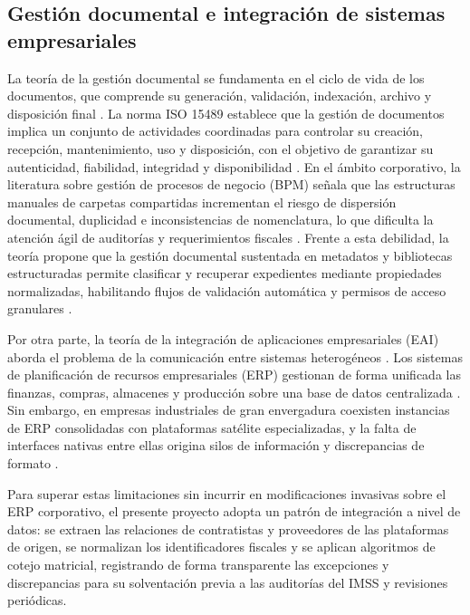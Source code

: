 \subsection{Gestión documental e integración de sistemas empresariales}

La teoría de la gestión documental se fundamenta en el ciclo de vida de los
documentos, que comprende su generación, validación, indexación, archivo y
disposición final \cite{iso15489}. La norma ISO 15489 establece que la gestión
de documentos implica un conjunto de actividades coordinadas para controlar su
creación, recepción, mantenimiento, uso y disposición, con el objetivo de
garantizar su autenticidad, fiabilidad, integridad y disponibilidad
\cite{iso15489}. En el ámbito corporativo, la literatura sobre gestión de
procesos de negocio (BPM) señala que las estructuras manuales de carpetas
compartidas incrementan el riesgo de dispersión documental, duplicidad e
inconsistencias de nomenclatura, lo que dificulta la atención ágil de auditorías
y requerimientos fiscales \cite{harmon2019bpm}. Frente a esta debilidad, la
teoría propone que la gestión documental sustentada en metadatos y bibliotecas
estructuradas permite clasificar y recuperar expedientes mediante propiedades
normalizadas, habilitando flujos de validación automática y permisos de acceso
granulares \cite{iso15489}.

Por otra parte, la teoría de la integración de aplicaciones empresariales (EAI)
aborda el problema de la comunicación entre sistemas heterogéneos
\cite{themistocleous2004eai}. Los sistemas de planificación de recursos
empresariales (ERP) gestionan de forma unificada las finanzas, compras,
almacenes y producción sobre una base de datos centralizada \cite{ibm2024erp}.
Sin embargo, en empresas industriales de gran envergadura coexisten instancias
de ERP consolidadas con plataformas satélite especializadas, y la falta de
interfaces nativas entre ellas origina silos de información y discrepancias de
formato \cite{themistocleous2004eai, ibm2024erpIntegracion}.

Para superar estas limitaciones sin incurrir en modificaciones invasivas sobre el
ERP corporativo, el presente proyecto adopta un patrón de integración a nivel de
datos: se extraen las relaciones de contratistas y proveedores de las plataformas
de origen, se normalizan los identificadores fiscales y se aplican algoritmos de
cotejo matricial, registrando de forma transparente las excepciones y
discrepancias para su solventación previa a las auditorías del IMSS y revisiones
periódicas.

